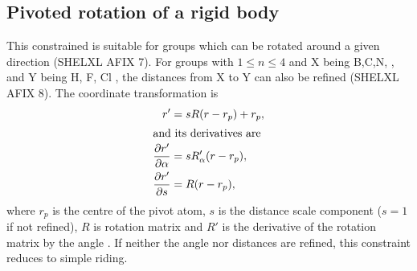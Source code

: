 \documentclass[11pt]{article}
\newcommand{\partialder}[2]{\frac{\partial #1}{\partial #2}}
\begin{document}
\subsection{Pivoted rotation of a rigid body}
\label{sec:pivoted:rotated:group}
This constrained is suitable for groups which can be rotated around a given direction (SHELXL AFIX 7). For groups  with $1\leq n \leq 4$ and X being B,C,N, , and Y being H, F, Cl , the distances from X to Y can also be refined (SHELXL AFIX 8). The coordinate transformation is
\begin{align}
r' &= sR(r-r_p) + r_{p},\\
\intertext{and its derivatives are}
\partialder{r'}{\alpha} &= sR'_\alpha(r - r_p),\\ 
\partialder{r'}{s} &= R(r-r_p),
\end{align}
where $r_p$ is the centre of the pivot atom, $s$ is the distance scale component ($s=1$ if not refined), $R$ is rotation matrix  and $R'$ is the derivative of the rotation matrix by the angle . If neither the angle nor distances are refined, this constraint reduces to simple riding.
\end{document}
